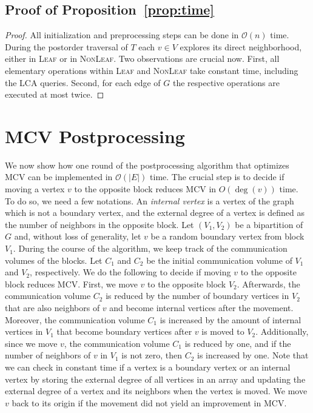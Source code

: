 \documentclass[pdftex]{llncs}
\newcommand{\bigO}{\mathcal{O}}
\numberwithin{equation}{section}
\numberwithin{example}{section}
\numberwithin{table}{section}
\begin{document}
\subsection{Proof of Proposition~\ref{prop:time}}
\begin{proof}
All initialization and preprocessing steps can be done in $\bigO(n)$
time. During the postorder traversal of $T$ each $v \in V$ explores
its direct neighborhood, either in \textsc{Leaf} or in
\textsc{NonLeaf}. Two observations are crucial now. First, all
elementary operations within \textsc{Leaf} and \textsc{NonLeaf} take
constant time, including the LCA queries. Second, for each edge of
$G$ the respective operations are executed at most twice.
\end{proof}

\section{MCV Postprocessing}
\label{sec:mcv-apx}
We now show how one round of the postprocessing algorithm that
optimizes MCV can be implemented in $\mathcal{O}({\vert E \vert})$
time.  The crucial step is to decide if moving a vertex $v$ to the
opposite block reduces MCV in $O(\deg(v))$ time. To do so, we need a
few notations.  An \emph{internal vertex} is a vertex of the graph
which is not a boundary vertex, and the external degree of a vertex is
defined as the number of neighbors in the opposite block.  Let $(V_1,
V_2)$ be a bipartition of $G$ and, without loss of generality, let $v$
be a random boundary vertex from block $V_1$. During the course of the
algorithm, we keep track of the communication volumes of the
blocks. Let $C_1$ and $C_2$ be the initial communication volume of
$V_1$ and $V_2$, respectively. We do the following to decide if moving
$v$ to the opposite block reduces MCV.  First, we move $v$ to the
opposite block $V_2$. Afterwards, the communication volume $C_2$ is
reduced by the number of boundary vertices in $V_2$ that are also
neighbors of $v$ and become internal vertices after the movement.
Moreover, the communication volume $C_1$ is increased by the amount of
internal vertices in $V_1$ that become boundary vertices after $v$ is
moved to $V_2$.  Additionally, since we move $v$, the communication
volume $C_1$ is reduced by one, and if the number of neighbors of $v$
in $V_1$ is not zero, then $C_2$ is increased by one.  Note that we
can check in constant time if a vertex is a boundary vertex or an
internal vertex by storing the external degree of all vertices in an
array and updating the external degree of a vertex and its neighbors
when the vertex is moved.  We move $v$ back to its origin if the
movement did not yield an improvement in MCV.
\end{document}
